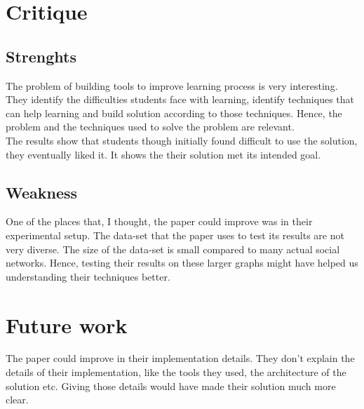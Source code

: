 \documentclass[12pt, onecolumn]{IEEEtran}
\begin{document}
\section{Critique}
\subsection{Strenghts}
The problem of building tools to improve learning process is very
interesting. They identify the difficulties students face with learning,
identify techniques that can help learning and build solution according to
those techniques. Hence, the problem and the techniques used to solve the
problem are relevant.
\\
The results show that students though initially found difficult to use the
solution, they eventually liked it. It shows the their solution met its
intended goal.

\subsection{Weakness}
One of the places that, I thought, the paper could improve was in their
experimental setup. The data-set that the paper uses to test its results are not
very diverse. The size of the data-set is small compared to many actual social
networks. Hence, testing their results on these larger graphs might have helped
us understanding their techniques better.
\\
\section{Future work}
The paper could improve in their implementation details. They don't explain
the details of their implementation, like the tools they used, the architecture
of the solution etc. Giving those details would have made their solution much
more clear.
\\


 
\end{document}

